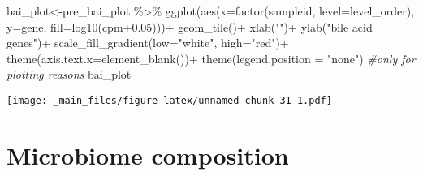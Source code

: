 \documentclass[
]{book}
\newenvironment{Shaded}{\begin{snugshade}}{\end{snugshade}}
\newcommand{\AttributeTok}[1]{\textcolor[rgb]{0.77,0.63,0.00}{#1}}
\newcommand{\CommentTok}[1]{\textcolor[rgb]{0.56,0.35,0.01}{\textit{#1}}}
\newcommand{\FloatTok}[1]{\textcolor[rgb]{0.00,0.00,0.81}{#1}}
\newcommand{\FunctionTok}[1]{\textcolor[rgb]{0.00,0.00,0.00}{#1}}
\newcommand{\NormalTok}[1]{#1}
\newcommand{\OtherTok}[1]{\textcolor[rgb]{0.56,0.35,0.01}{#1}}
\newcommand{\SpecialCharTok}[1]{\textcolor[rgb]{0.00,0.00,0.00}{#1}}
\newcommand{\StringTok}[1]{\textcolor[rgb]{0.31,0.60,0.02}{#1}}
\begin{document}
\begin{Shaded}
\begin{Highlighting}[]
\NormalTok{bai\_plot}\OtherTok{\textless{}{-}}\NormalTok{pre\_bai\_plot }\SpecialCharTok{\%\textgreater{}\%} 
  \FunctionTok{ggplot}\NormalTok{(}\FunctionTok{aes}\NormalTok{(}\AttributeTok{x=}\FunctionTok{factor}\NormalTok{(sampleid, }\AttributeTok{level=}\NormalTok{level\_order), }\AttributeTok{y=}\NormalTok{gene, }\AttributeTok{fill=}\FunctionTok{log10}\NormalTok{(cpm}\FloatTok{+0.05}\NormalTok{)))}\SpecialCharTok{+}
           \FunctionTok{geom\_tile}\NormalTok{()}\SpecialCharTok{+}
  \FunctionTok{xlab}\NormalTok{(}\StringTok{""}\NormalTok{)}\SpecialCharTok{+}
  \FunctionTok{ylab}\NormalTok{(}\StringTok{"bile acid genes"}\NormalTok{)}\SpecialCharTok{+}
  \FunctionTok{scale\_fill\_gradient}\NormalTok{(}\AttributeTok{low=}\StringTok{"white"}\NormalTok{, }\AttributeTok{high=}\StringTok{"red"}\NormalTok{)}\SpecialCharTok{+}
  \FunctionTok{theme}\NormalTok{(}\AttributeTok{axis.text.x=}\FunctionTok{element\_blank}\NormalTok{())}\SpecialCharTok{+}
  \FunctionTok{theme}\NormalTok{(}\AttributeTok{legend.position =} \StringTok{"none"}\NormalTok{) }\CommentTok{\#only for plotting reasons}
\NormalTok{bai\_plot}
\end{Highlighting}
\end{Shaded}

\texttt{[image: \_main\_files/figure-latex/unnamed-chunk-31-1.pdf]}

\hypertarget{microbiome-composition}{%
\section{Microbiome composition}\label{microbiome-composition}}
\end{document}
